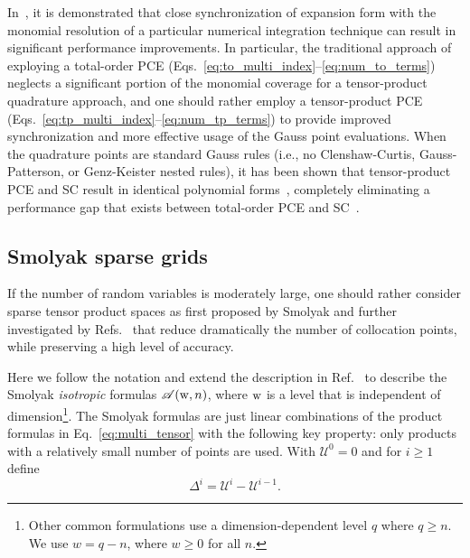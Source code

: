 In~\cite{Eld09a}, it is demonstrated that close synchronization of
expansion form with the monomial resolution of a particular numerical
integration technique can result in significant performance
improvements.  In particular, the traditional approach of exploying a
total-order PCE (Eqs.~\ref{eq:to_multi_index}--\ref{eq:num_to_terms})
neglects a significant portion of the monomial coverage for a
tensor-product quadrature approach, and one should rather employ a
tensor-product PCE (Eqs.~\ref{eq:tp_multi_index}--\ref{eq:num_tp_terms}) 
to provide improved synchronization and more effective usage of the
Gauss point evaluations.  When the quadrature points are standard
Gauss rules (i.e., no Clenshaw-Curtis, Gauss-Patterson, or
Genz-Keister nested rules), it has been shown that tensor-product PCE
and SC result in identical polynomial forms~\cite{ConstTPQ},
completely eliminating a performance gap that exists between
total-order PCE and SC~\cite{Eld09a}.


\subsection{Smolyak sparse grids} \label{uq:expansion:spectral_sparse}


If the number of random variables is moderately large, one should rather
consider sparse tensor product spaces as first proposed by Smolyak
\cite{Smolyak_63} and further investigated by Refs.~\cite{gerstner_griebel_98,barth_novak_ritter_00,Fran_Schwab_Todor_04,Xiu_Hesthaven_05, webster1, webster2}
that reduce dramatically the number of collocation points, while
preserving a high level of accuracy.

Here we follow the notation and extend the description in
Ref.~\cite{webster1} to describe the Smolyak {\it isotropic} formulas
$\mathscr{A}({\rm w},n)$, where ${\rm w}$ is a level that is independent of
dimension\footnote{Other common formulations use a dimension-dependent
level $q$ where $q \geq n$.  We use $w = q - n$, where $w \geq 0$ for
all $n$.}.  The Smolyak formulas are just linear combinations of the
product formulas in Eq.~\ref{eq:multi_tensor} with the following key
property: only products with a relatively small number of points are
used.  With $\mathscr{U}^0 = 0$ and for $i \geq 1$ define
%
\begin{equation}\label{eq:delta}
\Delta^i = \mathscr{U}^i-\mathscr{U}^{i-1}.
\end{equation}
%


